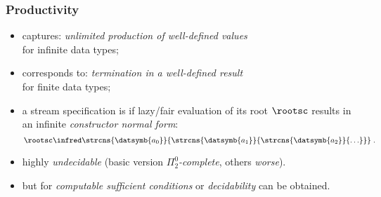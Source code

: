 \documentclass[10pt]{beamer}
\begin{document}
\begin{frame}%
  \frametitle{Productivity}

\hspace*{-5ex}
\begin{itemize}
  \item 
    captures: \emph{unlimited production of well-defined values}\\
    for infinite data types;
    \vspace*{1ex}
  \item corresponds to:
    \emph{termination in a well-defined result}\\
    for finite data types;
    \vspace*{1ex}
  \item a stream specification  
    is 
    if lazy/fair evaluation of its root
    $\rootsc$ results in an infinite \emph{constructor normal form}:
    \[
      \rootsc
      \infred
      \strcns{\datsymb{a_0}}{\strcns{\datsymb{a_1}}{\strcns{\datsymb{a_2}}{\ldots}}}
    \; .
    \]
  \item  highly \emph{undecidable}
    (basic version \emph{$\Pi^0_2$-complete}, others \emph{worse}). 
    \vspace*{1ex}
  \item but for  
    \emph{computable sufficient conditions}
    or \emph{decidability} can be obtained.
\end{itemize}
              
\end{frame}%
\end{document}
